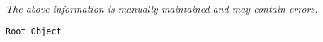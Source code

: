 \label{pkg:root\_object}

{\tiny \it The above information is manually maintained and may contain errors.}
\begin{verbatim}
Root_Object
\end{verbatim}
